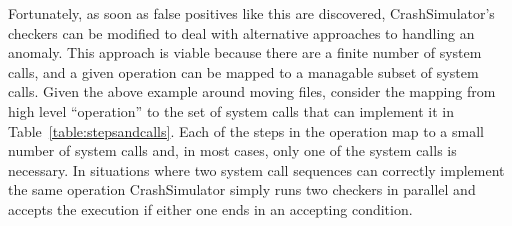 Fortunately, as soon as false positives like this are discovered,
CrashSimulator's checkers can be modified to deal with alternative
approaches to handling an anomaly.
This approach is viable because there are a finite number of system calls, and a
given operation can be mapped to a managable subset of system calls.  Given the
above example around moving files, consider the mapping from high level
``operation'' to the set of system calls that can implement it in
Table~\ref{table:stepsandcalls}.  Each of the steps in the operation map to a small
number of system calls and, in most cases, only one of the system calls is
necessary.  In situations where two system call sequences can correctly
implement the same operation CrashSimulator simply runs two checkers
in parallel and accepts the execution if either one ends in an accepting
condition.

